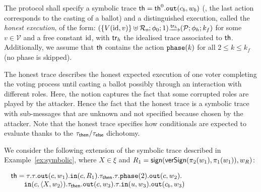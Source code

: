 \begin{definition}
\label{def:honest-trace}
The protocol shall specify a symbolic trace $\mathsf{th}=\mathsf{th}^0.\mathtt{out}(c_b,w_b)$
(\ie, the last action corresponds to the casting of a ballot) and
a distinguished execution, called the {\em honest execution}, of the form: %
$(\{V(\id,v)\}\uplus\roles_o; \phi_0; 1) 
\sint{\tr_h} (\p;\phi_h;k_f)$
for some $v\in\mathcal{V}$ and a free constant $\mathrm{id}$,
with $\mathsf{tr}_h$ the idealised trace associated to $\mathsf{th}$.
Additionally, we assume that $\mathsf{th}$ contains the action $\mathtt{phase}(k)$ for all $2 \le k\le k_f$ (no phase is skipped).
\end{definition}
%
 The honest trace describes the honest expected execution of one voter completing the voting process until casting a ballot
 possibly through an interaction  with different roles. 
 Here, the notion  captures the fact that some corrupted roles are played by the attacker.
 Hence the fact that the honest trace is a symbolic trace with sub-messages that are unknown and not specified because chosen
 by the attacker.
 Note that the honest trace specifies how conditionals are expected to evaluate thanks to
 the $\tau_{\mathsf{then}}\slash\tau_{\mathsf{else}}$ dichotomy.

%


\begin{example}
  \label{ex:foo-ht}
  We consider the following extension of the symbolic trace described in Example~\ref{ex:symbolic}, where $X\in\xi$ and
  $R_1=\mathsf{sign}(\mathsf{verSign}(\pi_2(w_1),\pi_1(w_1)),w_R)$:\\[0.5mm]
    \null\hfill
  \begin{small}
$ \begin{array}{c}
      \th=\tau.\tau.\Out(c,w_1).\In(c,R_1).\taut.\tau.\Phase{2}.
           \Out(c,w_2).\\
           \phantom{\th=\ }\In(c,\pair{X}{w_2}).\taut.\Out(c,w_3). \tau.
           \In(u,w_3).\Out(c_b,w_3)
    \end{array}$
  \end{small}
    \hfill\null
\end{example}

